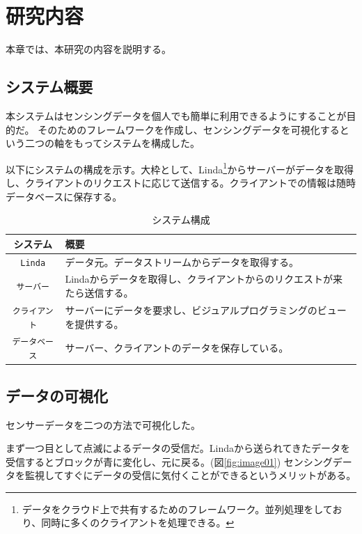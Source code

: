 \chapter{研究内容}
\label{chap:contents}

本章では、本研究の内容を説明する。

\section{システム概要}

本システムはセンシングデータを個人でも簡単に利用できるようにすることが目的だ。
そのためのフレームワークを作成し、センシングデータを可視化するという二つの軸をもってシステムを構成した。

以下にシステムの構成を示す。大枠として、Linda\footnote{データをクラウド上で共有するためのフレームワーク。並列処理をしており、同時に多くのクライアントを処理できる。}からサーバーがデータを取得し、クライアントのリクエストに応じて送信する。クライアントでの情報は随時データベースに保存する。

\begin{table}[htbp]
  \caption{システム構成}
  \label{tb:files}
  \begin{center}\begin{tabular}{c|l}
    \hline
    システム&概要\\\hline\hline
    {\tt Linda}&データ元。データストリームからデータを取得する。\\\hline
    {\tt サーバー}&Lindaからデータを取得し、クライアントからのリクエストが来たら送信する。\\\hline
    {\tt クライアント}&サーバーにデータを要求し、ビジュアルプログラミングのビューを提供する。\\\hline
    {\tt データベース}&サーバー、クライアントのデータを保存している。\\\hline
  \end{tabular}\end{center}
\end{table}

\section{データの可視化}
センサーデータを二つの方法で可視化した。

まず一つ目として点滅によるデータの受信だ。Lindaから送られてきたデータを受信するとブロックが青に変化し、元に戻る。(図\ref{fig:image01})
センシングデータを監視してすぐにデータの受信に気付くことができるというメリットがある。\\

